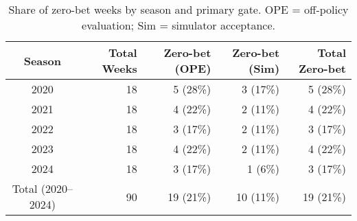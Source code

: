 \begin{table}[t]
  \centering
  \small
  \caption[Share of zero-bet weeks by season and primary gate]{Share of zero-bet weeks by season and primary gate. OPE = off-policy evaluation; Sim = simulator acceptance.}
  \label{tab:zero-weeks}
  \setlength{\tabcolsep}{4pt}\renewcommand{\arraystretch}{1.12}
  \begin{tabular}{@{} c r r r r @{} }
    \toprule
    \textbf{Season} & \textbf{Total Weeks} & \textbf{Zero-bet (OPE)} & \textbf{Zero-bet (Sim)} & \textbf{Total Zero-bet} \\
    \midrule
    2020 & 18 & 5 (28\%) & 3 (17\%) & 5 (28\%) \\
    2021 & 18 & 4 (22\%) & 2 (11\%) & 4 (22\%) \\
    2022 & 18 & 3 (17\%) & 2 (11\%) & 3 (17\%) \\
    2023 & 18 & 4 (22\%) & 2 (11\%) & 4 (22\%) \\
    2024 & 18 & 3 (17\%) & 1 (6\%) & 3 (17\%) \\
    \midrule
    Total (2020--2024) & 90 & 19 (21\%) & 10 (11\%) & 19 (21\%) \\
    \bottomrule
  \end{tabular}
\end{table}
